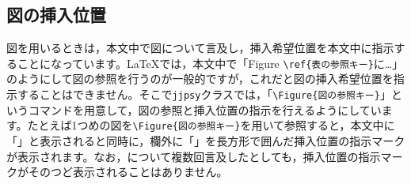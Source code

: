 \documentclass{jjpsy}
\begin{document}
\subsection{図の挿入位置}

図を用いるときは，本文中で図について言及し，挿入希望位置を本文中に指示することになっています。\LaTeX{}では，本文中で「Figure \texttt{\textbackslash{}ref\{表の参照キー\}}に\dots」のようにして図の参照を行うのが一般的ですが，これだと図の挿入希望位置を指示することはできません。そこで\texttt{jjpsy}クラスでは，「\texttt{\textbackslash{}Figure\{図の参照キー\}}」というコマンドを用意して，図の参照と挿入位置の指示を行えるようにしています。たとえば1つめの図を\texttt{\textbackslash{}Figure\{図の参照キー\}}を用いて参照すると，本文中に「」と表示されると同時に，欄外に「」を長方形で囲んだ挿入位置の指示マークが表示されます。なお，について複数回言及したとしても，挿入位置の指示マークがそのつど表示されることはありません。
\end{document}
